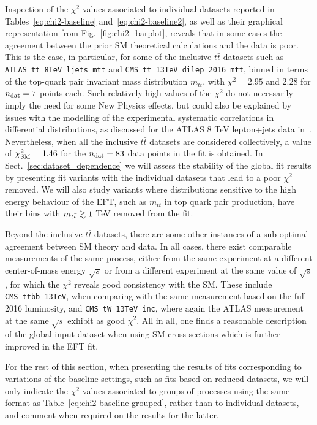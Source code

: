 Inspection of the $\chi^2$ values associated to individual datasets
reported in Tables~\ref{eq:chi2-baseline}
and~\ref{eq:chi2-baseline2}, as well
as their graphical representation from Fig.~\ref{fig:chi2_barplot},
reveals that in some cases the agreement
between the prior SM theoretical calculations and the data is poor.
%
This is the case, in particular, for some of the inclusive $t\bar{t}$ datasets such as
{\tt ATLAS\_tt\_8TeV\_ljets\_mtt} and
{\tt CMS\_tt\_13TeV\_dilep\_2016\_mtt}, binned in terms of the top-quark
pair invariant mass distribution $m_{t\bar{t}}$, with $\chi^2=2.95$ and 2.28
for $n_{\rm dat}=7$ points each.
%
Such relatively high values of the $\chi^2$ do not necessarily imply the need for
some New Physics effects,
but could also be explained by issues with the modelling of the experimental
systematic correlations in differential distributions, as discussed for the ATLAS 8 TeV
lepton+jets data in~\cite{Czakon:2016olj,Amoroso:2020lgh,ATL-PHYS-PUB-2018-017}.
%
Nevertheless, when all the inclusive $t\bar{t}$ datasets are considered collectively,
a value of $\chi^2_{\rm SM} = 1.46$ for  the $n_{\rm dat}=83$ data points in the fit is obtained.
%
In Sect.~\ref{sec:dataset_dependence} we will assess  the stability of the global
fit results by presenting fit variants with the individual datasets
that lead to a poor $\chi^2$ removed.
%
We will also study variants where distributions sensitive
to the high energy behaviour of the EFT, such as $m_{t\bar{t}}$ in top quark pair
production, have their bins with $m_{t\bar{t}}\gtrsim 1$ TeV removed from the fit.

Beyond the inclusive $t\bar{t}$ datasets, there are some other instances of a sub-optimal agreement
between SM theory and data.
%
In all cases, there exist comparable measurements of the same process, either
from the same experiment at a different center-of-mass energy
$\sqrt{s}$ or from a different experiment
at the same value of $\sqrt{s}$, for which the $\chi^2$ reveals good consistency with the SM.
%
These include {\tt CMS\_ttbb\_13TeV}, when comparing with the same measurement based
on the full 2016 luminosity, and
{\tt CMS\_tW\_13TeV\_inc}, where again the ATLAS measurement at the same $\sqrt{s}$
exhibit as good $\chi^2$.
%
All in all, one finds a reasonable description of the global input dataset
when using SM cross-sections which is further improved in the EFT fit.

For the rest of this section, when presenting the results of fits corresponding
to variations of the baseline settings, such as fits based on
reduced datasets, we will only indicate the $\chi^2$ values
associated to groups of processes using the same format
as Table~\ref{eq:chi2-baseline-grouped}, rather than to individual
datasets, and comment when required on the results for the latter.

